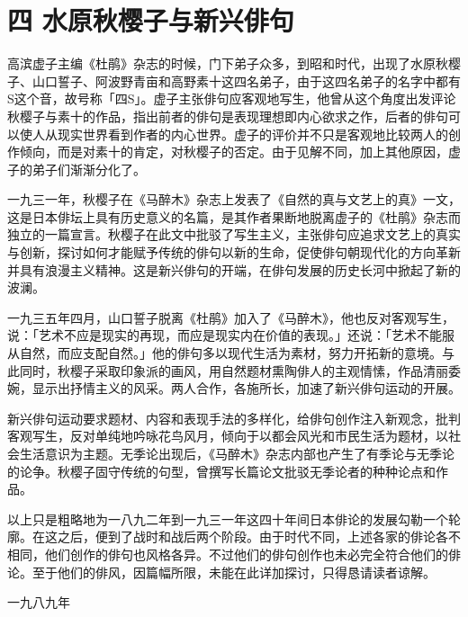 \section*{\FS 四 水原秋樱子与新兴俳句}

{\FS
    高滨虚子主编《杜鹃》杂志的时候，门下弟子众多，到昭和时代，出现了水原秋樱子、山口誓子、阿波野青亩和高野素十这四名弟子，由于这四名弟子的名字中都有S这个音，故号称「四S」。虚子主张俳句应客观地写生，他曾从这个角度出发评论秋樱子与素十的作品，指出前者的俳句是表现理想即内心欲求之作，后者的俳句可以使人从现实世界看到作者的内心世界。虚子的评价并不只是客观地比较两人的创作倾向，而是对素十的肯定，对秋樱子的否定。由于见解不同，加上其他原因，虚子的弟子们渐渐分化了。

    一九三一年，秋樱子在《马醉木》杂志上发表了《自然的真与文艺上的真》一文，这是日本俳坛上具有历史意义的名篇，是其作者果断地脱离虚子的《杜鹃》杂志而独立的一篇宣言。秋樱子在此文中批驳了写生主义，主张俳句应追求文艺上的真实与创新，探讨如何才能赋予传统的俳句以新的生命，促使俳句朝现代化的方向革新并具有浪漫主义精神。这是新兴俳句的开端，在俳句发展的历史长河中掀起了新的波澜。

    一九三五年四月，山口誓子脱离《杜鹃》加入了《马醉木》，他也反对客观写生，说：「艺术不应是现实的再现，而应是现实内在价值的表现。」还说：「艺术不能服从自然，而应支配自然。」他的俳句多以现代生活为素材，努力开拓新的意境。与此同时，秋樱子采取印象派的画风，用自然题材熏陶俳人的主观情愫，作品清丽委婉，显示出抒情主义的风采。两人合作，各施所长，加速了新兴俳句运动的开展。

    新兴俳句运动要求题材、内容和表现手法的多样化，给俳句创作注入新观念，批判客观写生，反对单纯地吟咏花鸟风月，倾向于以都会风光和市民生活为题材，以社会生活意识为主题。无季论出现后，《马醉木》杂志内部也产生了有季论与无季论的论争。秋樱子固守传统的句型，曾撰写长篇论文批驳无季论者的种种论点和作品。

    以上只是粗略地为一八九二年到一九三一年这四十年间日本俳论的发展勾勒一个轮廓。在这之后，便到了战时和战后两个阶段。由于时代不同，上述各家的俳论各不相同，他们创作的俳句也风格各异。不过他们的俳句创作也未必完全符合他们的俳论。至于他们的俳风，因篇幅所限，未能在此详加探讨，只得恳请读者谅解。

    \hfill 一九八九年
}
